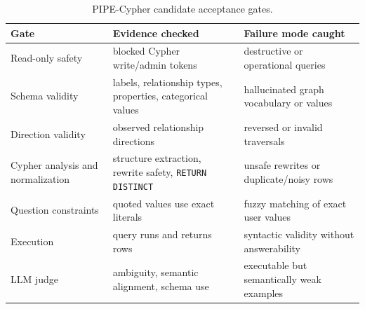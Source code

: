 \begin{table}[t]
\centering
\small
\begin{tabular}{p{}p{}p{}}
\toprule
Gate & Evidence checked & Failure mode caught \\
\midrule
Read-only safety & blocked Cypher write/admin tokens & destructive or operational queries \\
Schema validity & labels, relationship types, properties, categorical values & hallucinated graph vocabulary or values \\
Direction validity & observed relationship directions & reversed or invalid traversals \\
Cypher analysis and normalization & structure extraction, rewrite safety, \texttt{RETURN DISTINCT} & unsafe rewrites or duplicate/noisy rows \\
Question constraints & quoted values use exact literals & fuzzy matching of exact user values \\
Execution & query runs and returns rows & syntactic validity without answerability \\
LLM judge & ambiguity, semantic alignment, schema use & executable but semantically weak examples \\
\bottomrule
\end{tabular}
\caption{PIPE-Cypher candidate acceptance gates.}
\label{tab:gates}
\end{table}
